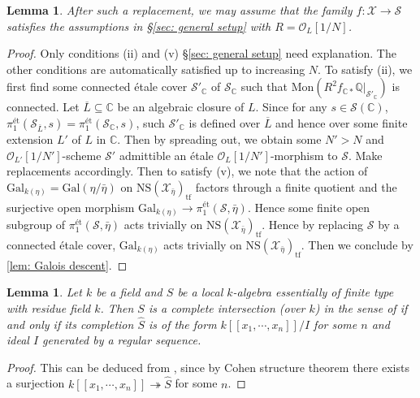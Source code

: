 \documentclass[letter, 11pt]{article}
\theoremstyle{plain}
\newtheorem{lemma}[subsubsection]{Lemma}
\theoremstyle{definition}
\newcommand{\IC}{\mathbb{C}}
\newcommand{\IQ}{\mathbb{Q}}
\newcommand{\<}{\langle}
\renewcommand{\>}{\rangle}
\newcommand{\sX}{\mathcal{X}}
\newcommand{\sS}{\mathcal{S}}
\newcommand{\sO}{\mathcal{O}}
\newcommand{\et}{\textrm{{\'e}t}}
\newcommand{\NS}{\mathrm{NS}}
\newcommand{\Gal}{\mathrm{Gal}}
\newcommand{\Mon}{\mathrm{Mon}}
\begin{document}
\begin{lemma}
\label{lem: replacement}
    After such a replacement, we may assume that the family $f : \sX \to \sS$ satisfies the assumptions in \S\ref{sec: general setup} with $R = \sO_L[1/N]$. 
\end{lemma}
\begin{proof}
    Only conditions (ii) and (v) \S\ref{sec: general setup} need explanation. The other conditions are automatically satisfied up to increasing $N$. To satisfy (ii), we first find some connected \'etale cover $\sS'_\IC$ of $\sS_\IC$ such that $\Mon(R^2 f_{\IC*} \IQ|_{\sS'_\IC})$ is connected. Let $\overline{L} \subseteq \IC$ be an algebraic closure of $L$. Since for any $s \in \sS(\IC)$, $\pi_1^\et(\sS_{\overline{L}}, s) = \pi_1^\et(\sS_\IC, s)$, such $\sS'_\IC$ is defined over $\overline{L}$ and hence over some finite extension $L'$ of $L$ in $\IC$. Then by spreading out, we obtain some $N' > N$ and $\sO_{L'}[1/N']$-scheme $\sS'$ admittible an \'etale $\sO_L[1/N']$-morphism to $\sS$. Make replacements accordingly. Then to satisfy (v), we note that the action of $\Gal_{k(\eta)} = \Gal(\eta/\bar{\eta})$ on $\NS(\sX_{\bar{\eta}})_{\mathrm{tf}}$ factors through a finite quotient and the surjective open morphism $\Gal_{k(\eta)} \to \pi_1^\et(\sS, \bar{\eta})$. Hence some finite open subgroup of $\pi_1^\et(\sS, \bar{\eta})$ acts trivially on  $\NS(\sX_{\bar{\eta}})_{\mathrm{tf}}$. Hence by replacing $\sS$ by a connected \'etale cover, $\Gal_{k(\eta)}$ acts trivially on $\NS(\sX_{\bar{\eta}})_{\mathrm{tf}}$. Then we conclude by \ref{lem: Galois descent}. 
\end{proof}

\begin{lemma}
\label{lem: pedantic lemma for lci}
    Let $k$ be a field and $S$ be a local $k$-algebra essentially of finite type with residue field $k$. Then $S$ is a complete intersection (over $k$) in the sense of \cite[00SD]{stacks-project} if and only if its completion $\hat{S}$ is of the form $k[\![x_1, \cdots, x_n]\!]/I$ for some $n$ and ideal $I$ generated by a regular sequence. 
\end{lemma}
\begin{proof}
    This can be deduced from \cite[09Q1]{stacks-project}, since by Cohen structure theorem \cite[032A]{stacks-project} there exists a surjection $k[\![x_1, \cdots, x_n]\!] \twoheadrightarrow \hat{S}$ for some $n$. 
\end{proof}
\end{document}
